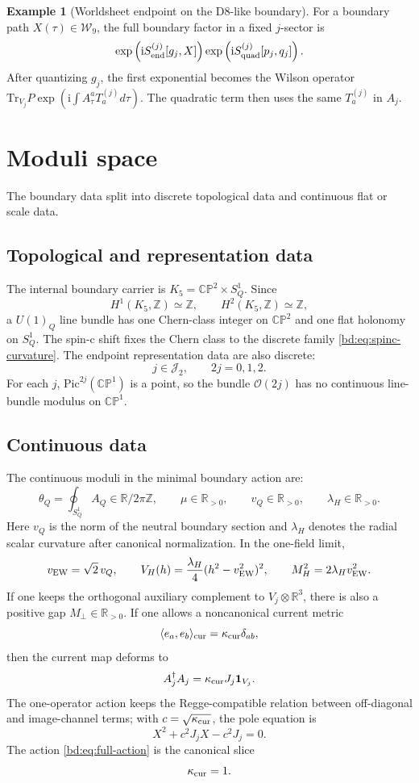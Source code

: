 \documentclass[11pt]{article}
\newcommand{\CP}{\mathbb{CP}}
\newcommand{\ZZ}{\mathbb{Z}}
\newcommand{\RR}{\mathbb{R}}
\newcommand{\JJ}{\mathcal{J}}
\newcommand{\WW}{\mathcal{W}}
\newcommand{\OO}{\mathcal{O}}
\newcommand{\ii}{\mathrm{i}}
\newcommand{\Tr}{\mathrm{Tr}}
\newcommand{\Pic}{\mathrm{Pic}}
\theoremstyle{plain}
\theoremstyle{definition}
\newtheorem{example}[proposition]{Example}
\begin{document}
\begin{example}[Worldsheet endpoint on the D8-like boundary]
\label{bd:ex:endpoint-worldsheet}
For a boundary path \(X(\tau)\in\WW_9\), the full boundary factor in a fixed
\(j\)-sector is
\[
  \exp\left(\ii S_{\rm end}^{(j)}[g_j,X]\right)
  \exp\left(\ii S_{\rm quad}^{(j)}[p_j,q_j]\right).
\]
After quantizing \(g_j\), the first exponential becomes the Wilson operator
\(\Tr_{V_j}P\exp(\ii\int A_\tau^aT_a^{(j)}d\tau)\).  The quadratic term then
uses the same \(T_a^{(j)}\) in \(A_j\).
\end{example}

\section{Moduli space}
\label{bd:sec:moduli}

The boundary data split into discrete topological data and continuous flat or
scale data.

\subsection*{Topological and representation data}
The internal boundary carrier is \(K_5=\CP^2\times S^1_Q\).  Since
\[
  H^1(K_5,\ZZ)\simeq\ZZ,\qquad H^2(K_5,\ZZ)\simeq\ZZ ,
\]
a \(U(1)_Q\) line bundle has one Chern-class integer on \(\CP^2\) and one flat
holonomy on \(S^1_Q\).  The spin-c shift fixes the Chern class to the discrete
family \eqref{bd:eq:spinc-curvature}.  The endpoint representation data are also
discrete:
\[
  j\in\JJ_2,\qquad 2j=0,1,2 .
\]
For each \(j\), \(\Pic^{2j}(\CP^1)\) is a point, so the bundle
\(\OO(2j)\) has no continuous line-bundle modulus on \(\CP^1\).

\subsection*{Continuous data}
The continuous moduli in the minimal boundary action are:
\[
  \theta_Q=\oint_{S^1_Q}A_Q\in\RR/2\pi\ZZ ,
  \qquad
  \mu\in\RR_{>0},
  \qquad
  v_Q\in\RR_{>0},
  \qquad
  \lambda_H\in\RR_{>0}.
  \label{bd:eq:continuous-moduli}
\]
Here \(v_Q\) is the norm of the neutral boundary section and
\(\lambda_H\) denotes the radial scalar curvature after canonical
normalization.  In the one-field limit,
\[
  v_{\rm EW}=\sqrt2\,v_Q,\qquad
  V_H(h)=\frac{\lambda_H}{4}(h^2-v_{\rm EW}^2)^2,\qquad
  M_H^2=2\lambda_Hv_{\rm EW}^2 .
  \label{bd:eq:higgs-quartic}
\]
If one keeps the orthogonal auxiliary complement to \(V_j\otimes\RR^3\), there
is also a positive gap \(M_\perp\in\RR_{>0}\).  If one allows a noncanonical
current metric
\[
  \langle e_a,e_b\rangle_{\rm cur}=\kappa_{\rm cur}\delta_{ab},
  \label{bd:eq:kappa}
\]
then the current map deforms to
\[
  A_j^\dagger A_j=\kappa_{\rm cur}J_j\mathbf 1_{V_j}.
\]
The one-operator action keeps the Regge-compatible relation between off-diagonal
and image-channel terms; with \(c=\sqrt{\kappa_{\rm cur}}\), the pole equation is
\begin{equation}
  X^2+c^2J_jX-c^2J_j=0 .
  \label{bd:eq:kappa-pole}
\end{equation}
The action \eqref{bd:eq:full-action} is the canonical slice
\[
  \kappa_{\rm cur}=1 .
  \label{bd:eq:kappa-one}
\]
\end{document}
